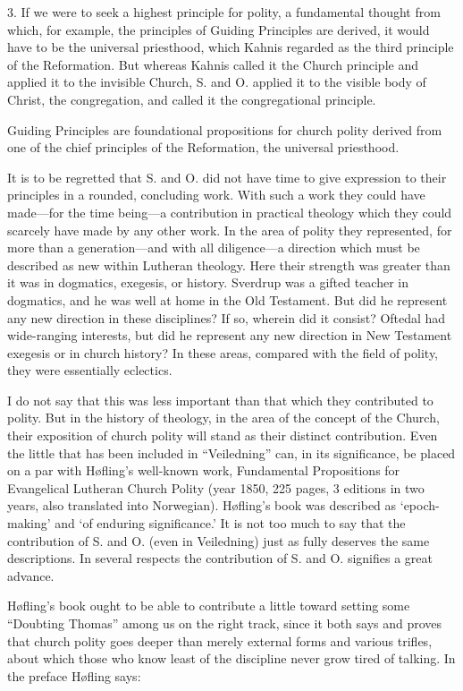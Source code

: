 3. If we were to seek a highest principle for polity, a fundamental thought from which, for example, the principles of Guiding Principles are derived, it would have to be the universal priesthood, which Kahnis regarded as the third principle of the Reformation. But whereas Kahnis called it the Church principle and applied it to the invisible Church, S. and O. applied it to the visible body of Christ, the congregation, and called it the congregational principle.

Guiding Principles are foundational propositions for church polity derived from one of the chief principles of the Reformation, the universal priesthood.

It is to be regretted that S. and O. did not have time to give expression to their principles in a rounded, concluding work. With such a work they could have made—for the time being—a contribution in practical theology which they could scarcely have made by any other work. In the area of polity they represented, for more than a generation—and with all diligence—a direction which must be described as new within Lutheran theology. Here their strength was greater than it was in dogmatics, exegesis, or history. Sverdrup was a gifted teacher in dogmatics, and he was well at home in the Old Testament. But did he represent any new direction in these disciplines? If so, wherein did it consist? Oftedal had wide-ranging interests, but did he represent any new direction in New Testament exegesis or in church history? In these areas, compared with the field of polity, they were essentially eclectics.

I do not say that this was less important than that which they contributed to polity. But in the history of theology, in the area of the concept of the Church, their exposition of church polity will stand as their distinct contribution. Even the little that has been included in “Veiledning” can, in its significance, be placed on a par with Høfling’s well-known work, Fundamental Propositions for Evangelical Lutheran Church Polity (year 1850, 225 pages, 3 editions in two years, also translated into Norwegian). Høfling’s book was described as ‘epoch-making’ and ‘of enduring significance.’ It is not too much to say that the contribution of S. and O. (even in Veiledning) just as fully deserves the same descriptions. In several respects the contribution of S. and O. signifies a great advance.

Høfling’s book ought to be able to contribute a little toward setting some “Doubting Thomas” among us on the right track, since it both says and proves that church polity goes deeper than merely external forms and various trifles, about which those who know least of the discipline never grow tired of talking. In the preface Høfling says:

